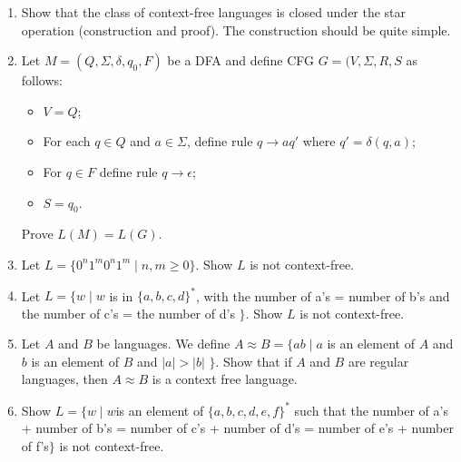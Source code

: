 \documentclass{article}
\begin{document}
\begin{enumerate}
        \item Show that the class of context-free languages is closed under the star operation (construction and proof). The construction should be quite simple.

        \item Let $M=(Q,\Sigma, \delta, q_0, F)$ be a DFA and define CFG $G=(V,\Sigma,R,S$ as follows:
            \begin{itemize}
                \item $V = Q$;
                \item For each $q\in Q$ and $ a\in \Sigma $, define rule $q\rightarrow aq'$ where $q'=\delta(q,a)$;
                \item For $q\in F$ define rule $q\rightarrow\epsilon$;
                \item $S=q_0$.
            \end{itemize}
            Prove $L(M) = L(G)$.

        \item Let $L=\{0^n1^m0^n1^m \mid n,m \geq 0\}$. Show $L$ is not context-free.

        \item Let $L=\{w\mid w $ is in $\{a,b,c,d\}^*$, with the number of a's = number of b's and the number of c's = the number of d's $\}$. Show $L$ is not context-free.

        \item Let $A$ and $B$ be languages. We define $A\approx B = \{ab \mid a $ is an element of $A$ and $b$ is an element of $B$ and $|a| > |b|$ $\}$. Show that if $A$ and $B$ are regular languages, then $A\approx B$ is a context free language.

        \item Show $L = \{w\mid w $is an element of $\{a,b,c,d,e,f\}^*$ such that the number of a's + number of b's = number of c's + number of d's = number of e's + number of f's$ \}$ is not context-free.
    \end{enumerate}
\end{document}
